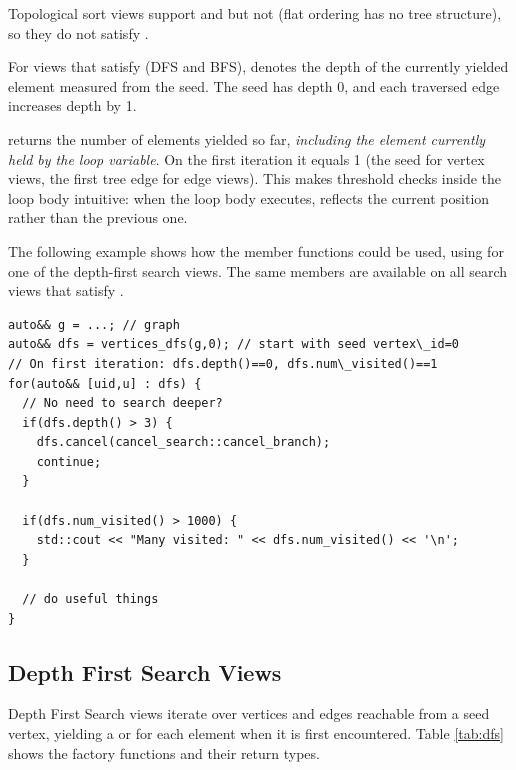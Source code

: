 Topological sort views support  and  but not  (flat ordering has no tree structure), so they do not satisfy .

For views that satisfy  (DFS and BFS),  denotes the depth of the currently yielded element measured from the seed. The seed has depth 0, and each traversed edge increases depth by 1.

 returns the number of elements yielded so far, \emph{including the element currently held by the loop variable}. On the first iteration it equals 1 (the seed for vertex views, the first tree edge for edge views). This makes threshold checks inside the loop body intuitive: when the loop body executes,  reflects the current position rather than the previous one.

The following example shows how the member functions could be used, using  for one of the depth-first search views. The same members are available on all search views that satisfy .
\begin{lstlisting}
auto&& g = ...; // graph
auto&& dfs = vertices_dfs(g,0); // start with seed vertex\_id=0
// On first iteration: dfs.depth()==0, dfs.num\_visited()==1
for(auto&& [uid,u] : dfs) {
  // No need to search deeper?
  if(dfs.depth() > 3) {
    dfs.cancel(cancel_search::cancel_branch);
    continue;
  }

  if(dfs.num_visited() > 1000) {
    std::cout << "Many visited: " << dfs.num_visited() << '\n';
  }

  // do useful things
}
\end{lstlisting}

\subsection{Depth First Search Views}

Depth First Search views iterate over vertices and edges reachable from a seed vertex, yielding a  or  for each element when it is first encountered. Table \ref{tab:dfs} shows the factory functions and their return types.

